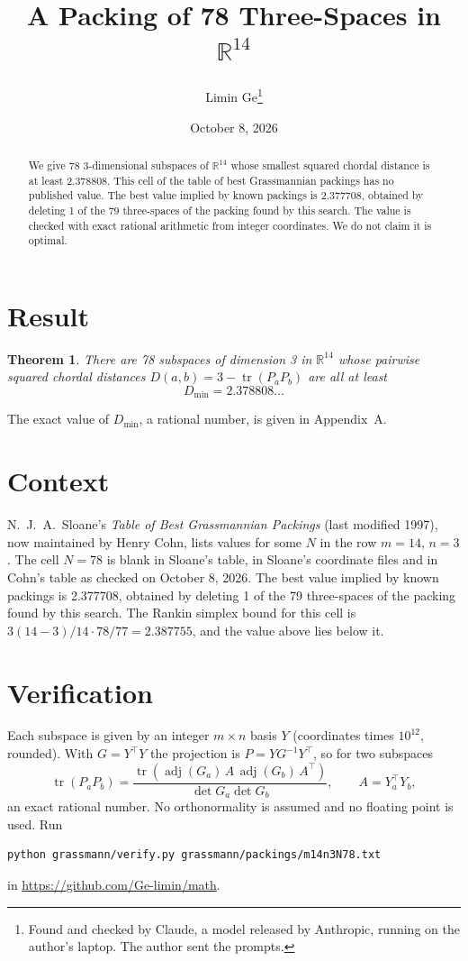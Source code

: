 \documentclass[11pt,a4paper]{article}
\title{A Packing of 78 Three-Spaces in $\mathbb{R}^{14}$}
\author{Limin Ge\thanks{Found and checked by Claude, a model released by Anthropic, running on the author's laptop. The author sent the prompts.}}
\date{October 8, 2026}
\newtheorem*{theorem}{Theorem}
\begin{document}
\maketitle
\begin{abstract}
We give 78 3-dimensional subspaces of $\mathbb{R}^{14}$ whose smallest squared chordal distance is at least 2.378808. This cell of the table of best Grassmannian packings has no published value. The best value implied by known packings is 2.377708, obtained by deleting 1 of the 79 three-spaces of the packing found by this search. The value is checked with exact rational arithmetic from integer coordinates. We do not claim it is optimal.
\end{abstract}

\section{Result}
\begin{theorem}
There are 78 subspaces of dimension 3 in $\mathbb{R}^{14}$ whose pairwise squared chordal distances $D(a,b) = 3 - \operatorname{tr}(P_aP_b)$ are all at least
\[ D_{\min} = 2.378808\ldots \]
\end{theorem}
The exact value of $D_{\min}$, a rational number, is given in Appendix~A.


\section{Context}
N.~J.~A.~Sloane's \emph{Table of Best Grassmannian Packings} (last modified 1997), now maintained by Henry Cohn, lists values for some $N$ in the row $m=14$, $n=3$. The cell $N=78$ is blank in Sloane's table, in Sloane's coordinate files and in Cohn's table as checked on October 8, 2026. The best value implied by known packings is 2.377708, obtained by deleting 1 of the 79 three-spaces of the packing found by this search. The Rankin simplex bound for this cell is $3(14-3)/14\cdot 78/77 = 2.387755$, and the value above lies below it.


\section{Verification}
Each subspace is given by an integer $m\times n$ basis $Y$ (coordinates times $10^{12}$, rounded). With $G=Y^\top Y$ the projection is $P=YG^{-1}Y^\top$, so for two subspaces
\[ \operatorname{tr}(P_aP_b)=\frac{\operatorname{tr}(\operatorname{adj}(G_a)\,A\,\operatorname{adj}(G_b)\,A^\top)}{\det G_a\det G_b},\qquad A=Y_a^\top Y_b, \]
an exact rational number. No orthonormality is assumed and no floating point is used. Run
\begin{verbatim}
python grassmann/verify.py grassmann/packings/m14n3N78.txt
\end{verbatim}
in \url{https://github.com/Ge-limin/math}.
\end{document}

